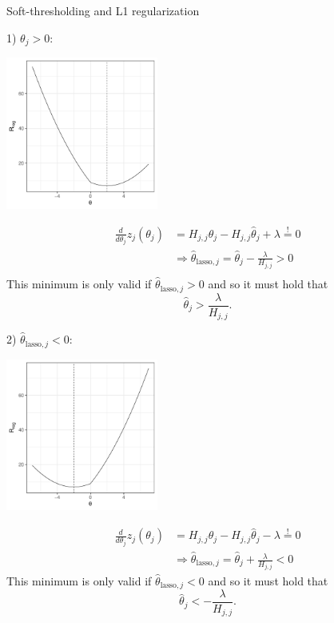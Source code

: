 \documentclass[11pt,compress,t,notes=noshow, xcolor=table]{beamer}
\begin{document}
\begin{vbframe}{Soft-thresholding and L1 regularization}
\framebreak

1) $\theta_j > 0:$ \\
\lz
\begin{minipage}{0.4\textwidth}
    \includegraphics[width=5cm]{figure/th_l1_pos.pdf}
\end{minipage}
\hfill
\begin{minipage}{0.49\textwidth}
\begin{align*}
    \frac{d}{d \theta_j}z_j(\theta_j) &= H_{j,j}\theta_j - H_{j,j} \hat{\theta}_j + \lambda \overset{!}{=} 0 \\
    &\Rightarrow  \hat{\theta}_{\text{lasso},j} = \hat{\theta}_j 
 -\frac{\lambda}{H_{j,j}} > 0 \\
 \end{align*}
 This minimum is only valid if $\hat{\theta}_{\text{lasso},j} > 0$ and so it must hold that
 \begin{equation*}
     \hat{\theta}_j >  \frac{\lambda}{H_{j,j}}.
 \end{equation*}
\end{minipage}
 \newpage

2) $\hat{\theta}_{\text{lasso},j} < 0:$ \\
\lz
\begin{minipage}{0.4\textwidth}
    \includegraphics[width=5cm]{figure/th_l1_neg.pdf}
\end{minipage}
\hfill
\begin{minipage}{0.49\textwidth}
\begin{align*}
    \frac{d}{d \theta_j}z_j(\theta_j) &= H_{j,j}\theta_j - H_{j,j} \hat{\theta}_j - \lambda \overset{!}{=} 0 \\
    &\Rightarrow  \hat{\theta}_{\text{lasso},j} = \hat{\theta}_j 
 +\frac{\lambda}{H_{j,j}} < 0
 \end{align*}
 This minimum is only valid if $\hat{\theta}_{\text{lasso},j} < 0$ and so it must hold that
 \begin{equation*}
     \hat{\theta}_j < -\frac{\lambda}{H_{j,j}}.
 \end{equation*}


\end{minipage}
\end{vbframe}
\end{document}
